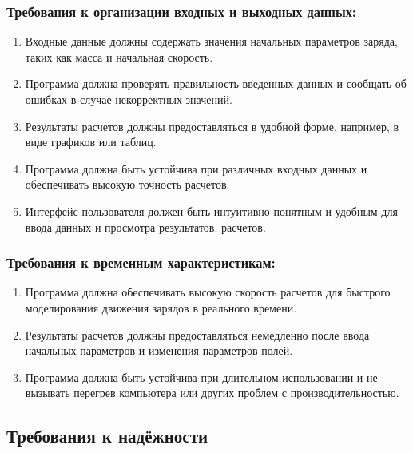  \subsubsection{Требования к организации входных и выходных данных:}

 \begin{enumerate}
  \item Входные данные должны содержать значения начальных параметров заряда, таких как масса и начальная скорость.
  \item Программа должна проверять правильность введенных данных и сообщать об ошибках в случае некорректных значений.
  \item Результаты расчетов должны предоставляться в удобной форме, например, в виде графиков или таблиц.
  \item Программа должна быть устойчива при различных входных данных и обеспечивать высокую точность расчетов.
  \item Интерфейс пользователя должен быть интуитивно понятным и удобным для ввода данных и просмотра результатов. расчетов.
 \end{enumerate}

 \subsubsection{Требования к временным характеристикам:}

 \begin{enumerate}
  \item Программа должна обеспечивать высокую скорость расчетов для быстрого моделирования движения зарядов в реального времени.
  \item Результаты расчетов должны предоставляться немедленно после ввода начальных параметров и изменения параметров полей.
  \item Программа должна быть устойчива при длительном использовании и не вызывать перегрев компьютера или других проблем с производительностью.
 \end{enumerate}

 \subsection{Требования к надёжности}
